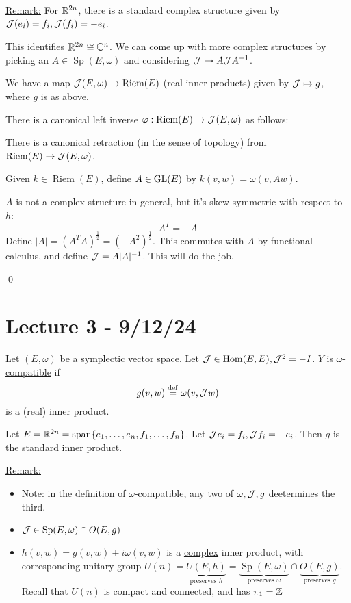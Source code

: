 \documentclass[x11names,reqno,14pt]{extarticle}
\DeclareMathOperator{\Sp}{Sp}
\DeclareMathOperator{\Riem}{Riem}
\DeclareMathOperator{\Span}{span}
\begin{document}
\underline{Remark:} For $\mathbb{R}^{2n}$, there is a standard complex structure given by $\mathcal{J}(e_i) = f_i, \mathcal{J}(f_i) = -e_i$.

This identifies $\mathbb{R}^{2n} \cong \mathbb{C}^n$. We can come up with more complex structures by picking an $A \in \Sp(E, \omega)$ and considering $\mathcal{J} \mapsto A\mathcal{J}A^{-1}$. 

We have a map $\mathcal{J}(E,\omega) \to \operatorname{Riem}(E)$ (real inner products) given by $\mathcal{J} \mapsto g$, where $g$ is as above. 

There is a canonical left inverse $\varphi:\operatorname{Riem}(E) \to \mathcal{J}(E,\omega)$ as follows: 

\prop There is a canonical retraction (in the sense of topology) from $\operatorname{Riem}(E) \to \mathcal{J}(E, \omega)$.

\proof

Given $k \in \Riem(E)$, define $A \in {\mathrm{GL}}(E)$ by $k(v, w) = \omega(v, Aw)$. 

$A$ is not a complex structure in general, but it's skew-symmetric with respect to $h$: 
\[
A^T = -A
\]
Define $|A| = (A^TA)^\frac12 = (-A^2)^\frac12$. This commutes with $A$ by functional calculus, and define $\mathcal{J} = A|A|^{-1}$. This will do the job. 

\qed

\section*{Lecture 3 - 9/12/24}

Let $(E, \omega)$ be a symplectic vector space. Let $\mathcal{J} \in {\mathrm{Hom}}(E, E), \mathcal{J}^2 = -I$. $Y$ is \underline{$\omega$-compatible} if 
\[
g(v, w) \overset{\mathrm{def}}{=} \omega(v, \mathcal{J}w)
\]
is a (real) inner product. 

\exm 

Let $E = \R^{2n} = \Span\{e_1, \dots, e_n, f_1, \dots, f_n\}$. Let $\mathcal{J}e_i = f_i, \mathcal{J}f_i = -e_i$. Then $g$ is the standard inner product. 

\underline{Remark:} 
\begin{itemize}

\item Note: in the definition of $\omega$-compatible, any two of $\omega, \mathcal{J}, g$ deetermines the third. 

\item $\mc{J} \in \Sp(E,\omega) \cap O(E, g)$

\item $h(v, w) = g(v, w) + i\omega(v, w)$ is a \underline{complex} inner product, with corresponding unitary group $U(n) = \underbrace{U(E, h)}_{\text{preserves }h} = \underbrace{\Sp(E, \omega)}_{\text{preserves }\omega} \cap \underbrace{O(E, g)}_{\text{preserves }g}$. Recall that $U(n)$ is compact and connected, and has $\pi_1 = \mathbb{Z}$

\end{itemize}
\end{document}
